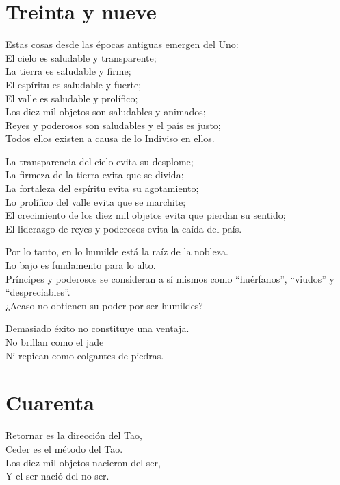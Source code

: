 \documentclass[book,b5paper,hidelinks,final]{memoir}
\begin{document}
	\chapter*{Treinta y nueve}
	
	Estas cosas desde las épocas antiguas emergen del Uno:\\
	El cielo es saludable y transparente;\\
	La tierra es saludable y firme;\\
	El espíritu es saludable y fuerte;\\
	El valle es saludable y prolífico;\\
	Los diez mil objetos son saludables y animados;\\
	Reyes y poderosos son saludables y el país es justo;\\
	Todos ellos existen a causa de lo Indiviso en ellos.
	
	La transparencia del cielo evita su desplome;\\
	La firmeza de la tierra evita que se divida;\\
	La fortaleza del espíritu evita su agotamiento;\\
	Lo prolífico del valle evita que se marchite;\\
	El crecimiento de los diez mil objetos evita que pierdan su sentido;\\
	El liderazgo de reyes y poderosos evita la caída del país.
	
	Por lo tanto, en lo humilde está la raíz de la nobleza.\\
	Lo bajo es fundamento para lo alto.\\
	Príncipes y poderosos se consideran a sí mismos como ``huérfanos'',
	``viudos'' y ``despreciables''.\\
	¿Acaso no obtienen su poder por ser humildes?
	
	Demasiado éxito no constituye una ventaja.\\
	No brillan como el jade\\
	Ni repican como colgantes de piedras.
	
	\chapter*{Cuarenta}
	
	Retornar es la dirección del Tao,\\
	Ceder es el método del Tao.\\
	Los diez mil objetos nacieron del ser,\\
	Y el ser nació del no ser.
	
\end{document}
